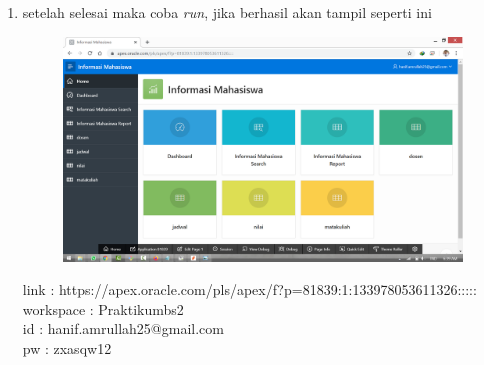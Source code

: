 \documentclass[11pt]{article}
\begin{document}
\begin{enumerate}
\item
setelah selesai maka coba \textit{run}, jika berhasil akan tampil seperti ini
	\begin{figure}[h]
        \centerline{\includegraphics[scale=0.1]{img/b4.png}}
        \centering
        \caption{}
		\label{langkah25}
	\end{figure}
	
\par
link : https://apex.oracle.com/pls/apex/f?p=81839:1:133978053611326:::::\\
workspace : Praktikumbs2\\
id 	  : hanif.amrullah25@gmail.com\\
pw 	  : zxasqw12

	\end{enumerate}
		
\end{document}

